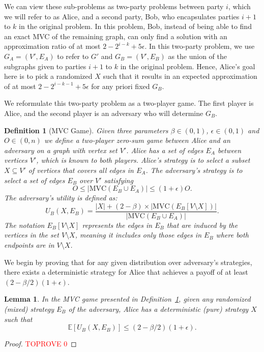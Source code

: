\documentclass[11pt]{article}
\newtheorem{lemma}[theorem]{Lemma}
\newtheorem{definition}[theorem]{Definition}
\newcommand{\E}[0]{\ensuremath{\mathbb{E}}}
\begin{document}
We can view these sub-problems as two-party problems between party $i$, which we will refer to as Alice, and a second party, Bob, who encapsulates parties $i+1$ to $k$ in the original problem. In this problem, Bob, instead of being able to find an exact MVC of the remaining graph, can only find a solution with an approximation ratio of at most $2-2^{i-k}+5\epsilon$. In this two-party problem, we use $G_A = (V', E_A)$ to refer to $G'$ and $G_B = (V', E_B)$ as the union of the subgraphs given to parties $i+1$ to $k$ in the original problem. Hence, Alice's goal here is to pick a randomized $X$ such that it results in an expected approximation of at most $ 2-2^{i-k-1}+5\epsilon$ for  any priori fixed $G_B$. 

We reformulate this two-party problem as a two-player game. The first player is Alice, and the second player is an adversary who will determine $G_B$. 

\begin{definition}[MVC Game] \label{def:Game} Given three parameters \(\beta \in (0,1)\), $\epsilon\in (0,1)$ and $O\in (0,n)$ we define a two-player zero-sum game between Alice and an adversary on a graph with vertex set \(V'\). Alice has a set of edges \(E_A\) between vertices \(V'\), which is known to both players. Alice's strategy is to select a subset \(X \subseteq V'\) of vertices that covers all edges in \(E_A\). The adversary's strategy is to select a set of edges \(E_B\) over \(V'\) satisfying \[
O\leq |\mathrm{MVC}(E_B \cup E_A)|\leq (1+\epsilon)O.\] The adversary's utility is defined as:
\begin{equation} \label{utility}
    U_B(X, E_B) = \frac{|X| + (2-\beta) \times |\mathrm{MVC}(E_B[V \setminus X])|}{|\mathrm{MVC}(E_B \cup E_A)|}.
\end{equation}
The notation \(E_B[V \setminus X]\) represents the edges in \(E_B\) that are induced by the vertices in the set \(V \setminus X\), meaning it includes only those edges in \(E_B\) where both endpoints are in \(V \setminus X\). 
\end{definition}

We begin by proving that for any given distribution over adversary's
strategies, there exists a deterministic strategy for Alice that
achieves a payoff of at least $(2-\beta/2)(1+\epsilon)$.

\begin{lemma}\label{lemma:pure}
    In the MVC game presented in Definition~\ref{def:Game}, given any
    randomized (mixed) strategy $E_B$ of the adversary, Alice has a
    deterministic (pure) strategy $X$ such that \[
    \E[U_B(X, E_B)]\leq
    (2-\beta/2)(1+\epsilon).\]
\end{lemma}
\begin{proof}\textcolor{red}{TOPROVE 0}\end{proof}
\end{document}
